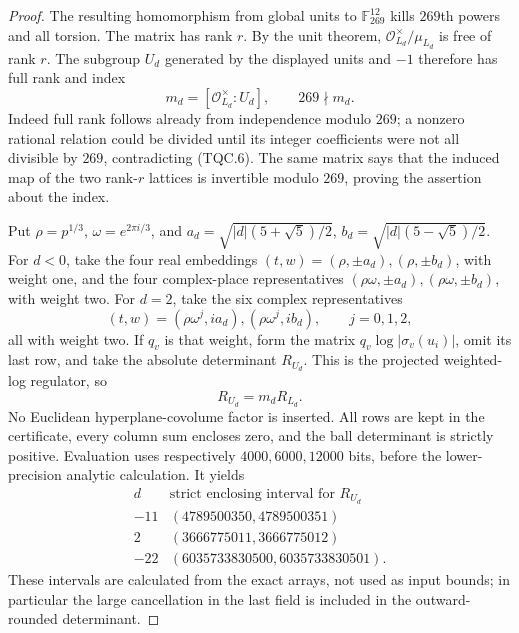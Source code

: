 \begin{proof}
The resulting homomorphism from global units to
$\mathbb F_{269}^{12}$ kills $269$th powers and all torsion.
The matrix has rank $r$.  By the unit theorem,
$\mathcal O_{L_d}^{\times}/\mu_{L_d}$ is free of rank $r$.
The subgroup $U_d$ generated by the displayed units and $-1$
therefore has full rank and index
\[
 m_d=[\mathcal O_{L_d}^{\times}:U_d],\qquad 269\nmid m_d.
 \tag{TQC.7}
\]
Indeed full rank follows already from independence modulo $269$;
a nonzero rational relation could be divided until its integer
coefficients were not all divisible by $269$, contradicting
(TQC.6).  The same matrix says that the induced map of the two
rank-$r$ lattices is invertible modulo $269$, proving the assertion
about the index.

Put $\rho=p^{1/3}$, $\omega=e^{2\pi i/3}$, and
$a_d=\sqrt{|d|(5+\sqrt5)/2}$,
$b_d=\sqrt{|d|(5-\sqrt5)/2}$.
For $d<0$, take the four real embeddings
$(t,w)=(\rho,\pm a_d),(\rho,\pm b_d)$, with weight one,
and the four complex-place representatives
$(\rho\omega,\pm a_d),(\rho\omega,\pm b_d)$, with weight two.
For $d=2$, take the six complex representatives
\[
 (t,w)=(\rho\omega^j,ia_d),(\rho\omega^j,ib_d),
                          \qquad j=0,1,2,
 \tag{TQC.8}
\]
all with weight two.
If $q_v$ is that weight, form the matrix
$q_v\log|\sigma_v(u_i)|$, omit its last row, and take the
absolute determinant $R_{U_d}$.
This is the projected weighted-log regulator, so
\[
                         R_{U_d}=m_d R_{L_d}.
 \tag{TQC.9}
\]
No Euclidean hyperplane-covolume factor is inserted.
All rows are kept in the certificate, every column sum encloses
zero, and the ball determinant is strictly positive.
Evaluation uses respectively $4000,6000,12000$ bits, before the
lower-precision analytic calculation.  It yields
\[
\begin{array}{c|c}
d&\text{strict enclosing interval for }R_{U_d}\\\hline
-11&(4789500350,4789500351)\\
2&(3666775011,3666775012)\\
-22&(6035733830500,6035733830501).
\end{array}
\tag{TQC.10}
\]
These intervals are calculated from the exact arrays, not used
as input bounds; in particular the large cancellation in the
last field is included in the outward-rounded determinant.


\end{proof}

